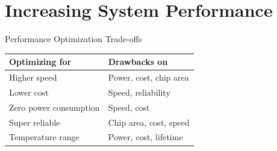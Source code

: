 \section{Increasing System Performance}

\begin{concept}{Performance Optimization Trade-offs}\\
\begin{tabular}{|l|l|}
\hline
\textbf{Optimizing for} & \textbf{Drawbacks on} \\
\hline
Higher speed & Power, cost, chip area \\
\hline
Lower cost & Speed, reliability \\
\hline
Zero power consumption & Speed, cost \\
\hline
Super reliable & Chip area, cost, speed \\
\hline
Temperature range & Power, cost, lifetime \\
\hline
\end{tabular}
\end{concept}

